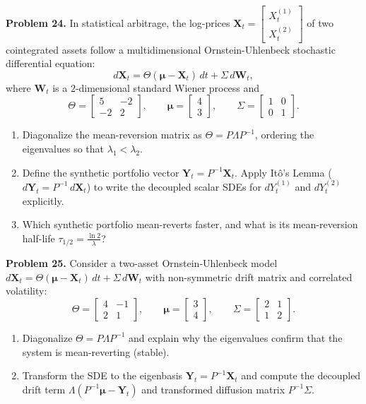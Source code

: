 \documentclass[11pt, letterpaper]{article}
\theoremstyle{definition}
\theoremstyle{remark}
\begin{document}
\textbf{Problem 24.}\label{prob:24}
In statistical arbitrage, the log-prices $\mathbf{X}_{t} = \begin{bmatrix} X_{t}^{(1)} \\ X_{t}^{(2)} \end{bmatrix}$ of two cointegrated assets follow a multidimensional Ornstein-Uhlenbeck stochastic differential equation:
\[
d\mathbf{X}_{t} = \Theta(\boldsymbol{\mu} - \mathbf{X}_{t})\,dt + \Sigma\,d\mathbf{W}_{t},
\]
where $\mathbf{W}_{t}$ is a $2$-dimensional standard Wiener process and
\[
\Theta = \begin{bmatrix} 5 & -2 \\ -2 & 2 \end{bmatrix}, \qquad \boldsymbol{\mu} = \begin{bmatrix} 4 \\ 3 \end{bmatrix}, \qquad \Sigma = \begin{bmatrix} 1 & 0 \\ 0 & 1 \end{bmatrix}.
\]
\begin{enumerate}[label=(\alph*)]
    \item Diagonalize the mean-reversion matrix as $\Theta = P\Lambda P^{-1}$, ordering the eigenvalues so that $\lambda_{1} < \lambda_{2}$.
    \item Define the synthetic portfolio vector $\mathbf{Y}_{t} = P^{-1}\mathbf{X}_{t}$. Apply It\^{o}'s Lemma ($d\mathbf{Y}_{t} = P^{-1}\,d\mathbf{X}_{t}$) to write the decoupled scalar SDEs for $dY_{t}^{(1)}$ and $dY_{t}^{(2)}$ explicitly.
    \item Which synthetic portfolio mean-reverts faster, and what is its mean-reversion half-life $\tau_{1/2} = \frac{\ln 2}{\lambda}$?
\end{enumerate}

\textbf{Problem 25.}\label{prob:25}
Consider a two-asset Ornstein-Uhlenbeck model $d\mathbf{X}_{t} = \Theta(\boldsymbol{\mu} - \mathbf{X}_{t})\,dt + \Sigma\,d\mathbf{W}_{t}$ with non-symmetric drift matrix and correlated volatility:
\[
\Theta = \begin{bmatrix} 4 & -1 \\ 2 & 1 \end{bmatrix}, \qquad \boldsymbol{\mu} = \begin{bmatrix} 3 \\ 4 \end{bmatrix}, \qquad \Sigma = \begin{bmatrix} 2 & 1 \\ 1 & 2 \end{bmatrix}.
\]
\begin{enumerate}[label=(\alph*)]
    \item Diagonalize $\Theta = P\Lambda P^{-1}$ and explain why the eigenvalues confirm that the system is mean-reverting (stable).
    \item Transform the SDE to the eigenbasis $\mathbf{Y}_{t} = P^{-1}\mathbf{X}_{t}$ and compute the decoupled drift term $\Lambda(P^{-1}\boldsymbol{\mu} - \mathbf{Y}_{t})$ and transformed diffusion matrix $P^{-1}\Sigma$.
\end{enumerate}
\end{document}
